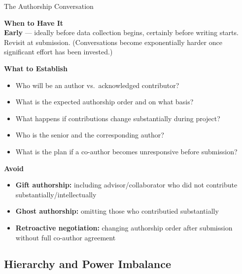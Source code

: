 \documentclass{beamer}
\begin{document}
\begin{frame}{The Authorship Conversation}

  \footnotesize
  \textbf{When to Have It}\\
  \smallskip
  \textbf{Early} --- ideally before data collection begins,
  certainly before writing starts. Revisit at submission.
  (Conversations become exponentially harder once
  significant effort has been invested.)

  \medskip
  \textbf{What to Establish}
  \begin{itemize}
    \item Who will be an author vs.\ acknowledged contributor?
    \item What is the expected authorship order and on what basis?
    \item What happens if contributions change substantially
      during project?
    \item Who is the senior and the corresponding author?
    \item What is the plan if a co-author becomes unresponsive
      before submission?
  \end{itemize}

  \medskip
  \textbf{Avoid}
  \begin{itemize}
    \item \textbf{Gift authorship:} including advisor/collaborator who did not contribute substantially/intellectually
    \item \textbf{Ghost authorship:} omitting those who  contributied substantially
    \item \textbf{Retroactive negotiation:} changing authorship
      order after submission without full co-author agreement
  \end{itemize}

\end{frame}


\subsection{Hierarchy and Power Imbalance}
\end{document}

